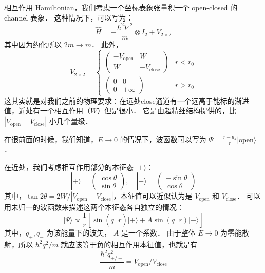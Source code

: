
相互作用 Hamiltonian，我们考虑一个坐标表象张量积一个 open-closed 的 channel 表象． 这种情况下，可以写为：
\begin{equation}
\hat{H} = -\frac{\hbar^2\nabla^2}{m}\otimes I_2+V_{2\times2}
\end{equation}
其中因为约化所以 $2m\to m$． 此外，
\begin{equation}
V_{2\times2} = \begin{cases}
\left(\begin{matrix}
-V_{\text{open}} & W\\
W & -V_{\text{close}}
\end{matrix}\right) & r < r_0\\
\left(\begin{matrix}
0 & 0\\
0 & +\infty
\end{matrix}\right) & r > r_0
\end{cases} 
\end{equation}
这其实就是对我们之前的物理要求：在远处close通道有一个远高于能标的渐进值，近处有一个相互作用（$W$）但是很小． 它是由超精细结构提供的，比 $|V_{\text{open}}-V_{\text{close}}|$ 小几个量级．

在很前面的时候，我们知道，$E\to0$ 的情况下，波函数可以写为 $\Psi=\frac{r-a_s}{r}|\text{open}\rangle$．

在近处，我们考虑相互作用部分的本征态 $|\pm\rangle$：
\begin{equation}
|+\rangle = \left(\begin{matrix}\cos\theta\\\sin\theta\end{matrix}\right),\quad |-\rangle = \left(\begin{matrix}-\sin\theta\\\cos\theta\end{matrix}\right)
\end{equation}
其中，$\tan2\theta = 2W/|V_{\text{open}}-V_{\text{close}}|$，本征值可以近似认为是 $V_{\text{open}}$ 和 $V_{\text{close}}$． 可以用未归一的波函数来描述这两个本征态各自独立的情况：
\begin{equation}
|\Psi\rangle\propto\frac{1}{r}\left[\sin(q_+r)|+\rangle + A\sin(q_-r)|-\rangle\right]
\end{equation}
其中，$q_+,q_-$ 为该能量下的波矢， $A$ 是一个系数． 由于整体 $E\to0$ 为零能散射，所以 $\hbar^2q^2/m$ 就应该等于负的相互作用本征值，也就是有
\begin{equation}
\frac{\hbar^2q_{+/-}^2}{m} = V_{\text{open}}/V_{\text{close}}
\end{equation}

